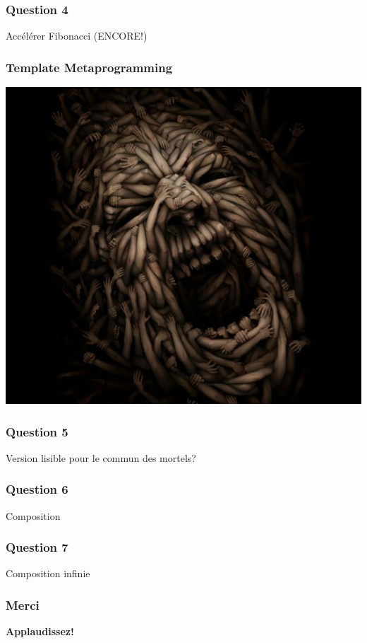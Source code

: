 \documentclass{beamer}
\begin{document}
\begin{frame}
\frametitle{Question 4}
\begin{center}
\Huge{Accélérer Fibonacci (ENCORE!)}
\end{center}
\end{frame}

\begin{frame}
\frametitle{Template Metaprogramming}
\begin{center}
\includegraphics[scale=0.4]{TMP.jpg}
\end{center}
\end{frame}

\begin{frame}
\frametitle{Question 5}
\begin{center}
\Huge{Version lisible pour le commun des mortels?}
\end{center}
\end{frame}

\begin{frame}
\frametitle{Question 6}
\begin{center}
\Huge{Composition}
\end{center}
\end{frame}

\begin{frame}
\frametitle{Question 7}
\begin{center}
\Huge{Composition infinie}
\end{center}
\end{frame}

\begin{frame}
\frametitle{Merci}
\begin{center}
\Huge{\textbf{Applaudissez!}}
\end{center}
\end{frame}
\end{document}
